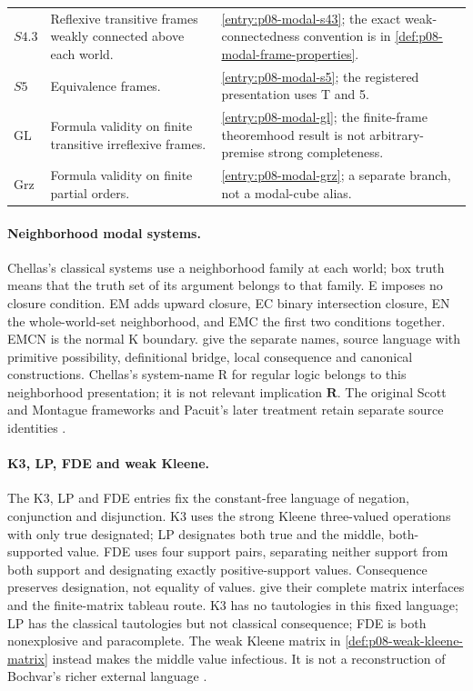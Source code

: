\begin{longtable}{@{}p{}p{}p{}@{}}
\(S4.3\) & Reflexive transitive frames weakly connected above each world. &
\cref{entry:p08-modal-s43}; the exact weak-connectedness convention is
in \cref{def:p08-modal-frame-properties}.\\\addlinespace
\(S5\) & Equivalence frames. & \cref{entry:p08-modal-s5}; the
registered presentation uses T and 5.\\\addlinespace
GL & Formula validity on finite transitive irreflexive frames. &
\cref{entry:p08-modal-gl}; the finite-frame theoremhood result is not
arbitrary-premise strong completeness.\\\addlinespace
Grz & Formula validity on finite partial orders. &
\cref{entry:p08-modal-grz}; a separate branch, not a modal-cube alias.\\
\end{longtable}

\paragraph{Neighborhood modal systems.}
\label{entry:p14-directory-neighborhood}
Chellas's classical systems use a neighborhood family at each world;
box truth means that the truth set of its argument belongs to that family.
E imposes no closure condition. EM adds upward closure, EC binary
intersection closure, EN the whole-world-set neighborhood, and EMC the
first two conditions together. EMCN is the normal K boundary.
give the separate names, source language with primitive possibility,
definitional bridge, local consequence and canonical constructions.
Chellas's system-name R for regular logic belongs to this neighborhood
presentation; it is not relevant implication \(\mathbf R\).
The original Scott and Montague frameworks and Pacuit's later treatment
retain separate source identities \cite{Scott1970,Montague1970Pragmatics,Chellas1980,Pacuit2017}.

\paragraph{K3, LP, FDE and weak Kleene.}
\label{entry:p14-directory-finite-matrices}
The K3, LP and FDE entries fix the constant-free language of negation,
conjunction and disjunction. K3 uses the strong Kleene three-valued
operations with only true designated; LP designates both true and the
middle, both-supported value. FDE uses four support pairs, separating
neither support from both support and designating exactly positive-support
values. Consequence preserves designation, not equality of values.
give their complete matrix interfaces and the finite-matrix tableau route.
K3 has no tautologies in this fixed language; LP has the classical
tautologies but not classical consequence; FDE is both nonexplosive and
paracomplete. The weak Kleene matrix in
\cref{def:p08-weak-kleene-matrix} instead makes the middle value
infectious. It is not a reconstruction of Bochvar's richer external
language \cite{Kleene1952,Priest1979,Dunn1976,Belnap1977,OmoriWansing2017}.

